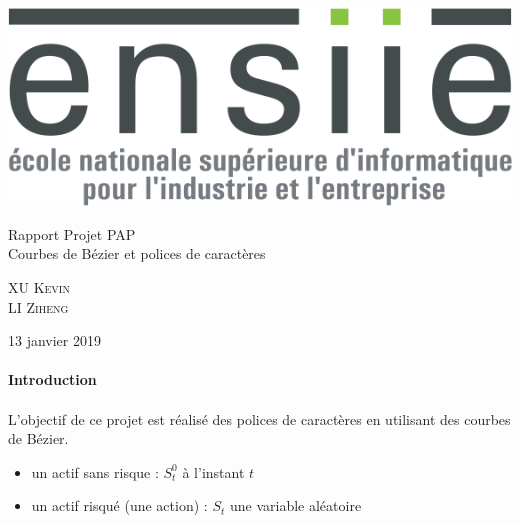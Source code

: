 \documentclass[a4paper, 12pt]{article}
\begin{document}
\begin{titlepage}
			\includegraphics[scale=0.25]{Images/Logo_transparent.png} 
			\begin{center}
				\vspace*{6cm}
				{ \huge Rapport Projet PAP \\
				Courbes de Bézier et polices de caractères \\
				}
			\vspace*{2cm}
				\begin{center} \large
					\textsc{XU} \textsc{Kevin}\\
					\textsc{LI} \textsc{Ziheng}
				\end{center}
				\begin{minipage}{0.4\textwidth}
				\end{minipage}
				{\large 13 janvier 2019}
			\end{center}
	\end{titlepage}


	\renewcommand{\contentsname}{Sommaire} 
	{\setlength{\baselineskip}{1.2\baselineskip}
\tableofcontents\par}%
		
	\newpage
	\vspace*{3cm} %
	\paragraph{\Huge{Introduction}}

	\paragraph{}
	L'objectif de ce projet est réalisé des polices de caractères en utilisant des courbes de Bézier.\\
\begin{itemize}
\item un actif sans risque : $S_t^0$ à l'instant $t$  
\item un actif risqué (une action) : $S_t$ une variable aléatoire 
\end{itemize}
	
\end{document}
